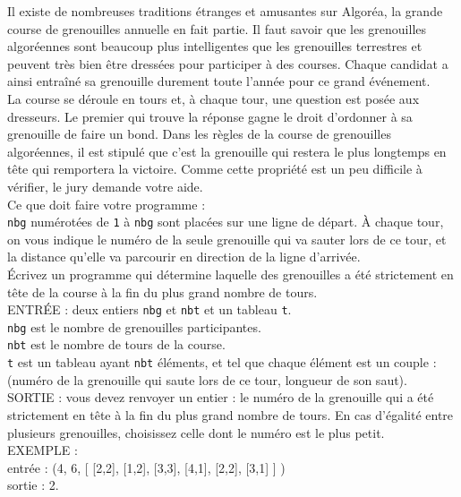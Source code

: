\exer{}
\setcounter{numques}{0}

Il existe de nombreuses traditions étranges et amusantes sur Algoréa, la grande course de 
grenouilles annuelle en fait partie. Il faut savoir que les grenouilles algoréennes sont beaucoup 
plus intelligentes que les grenouilles terrestres et peuvent très bien être dressées pour participer 
à des courses. Chaque candidat a ainsi entraîné sa grenouille durement toute l'année pour ce grand 
événement.\\
La course se déroule en tours et, à chaque tour, une question est posée aux dresseurs. Le premier 
qui trouve la réponse gagne le droit d'ordonner à sa grenouille de faire un bond. Dans les règles de 
la course de grenouilles algoréennes, il est stipulé que c'est la grenouille qui restera le plus 
longtemps en tête qui remportera la victoire. Comme cette propriété est un peu difficile à vérifier, 
le jury demande votre aide.\\
Ce que doit faire votre programme :\\

\noindent \texttt{nbg} numérotées de \texttt{1} à \texttt{nbg} sont placées sur une ligne 
de départ. À chaque tour, on vous indique le numéro de la seule grenouille qui va sauter lors de ce 
tour, et la distance qu'elle va parcourir en direction de la ligne d'arrivée.\\
Écrivez un programme qui détermine laquelle des grenouilles a été strictement en tête de la course 
à la fin du plus grand nombre de tours.\\

\noindent ENTRÉE : deux entiers \texttt{nbg} et \texttt{nbt} et un tableau \texttt{t}.\\
\texttt{nbg} est le nombre de grenouilles participantes.\\
\texttt{nbt} est le nombre de tours de la course.\\
\texttt{t} est un tableau ayant \texttt{nbt} éléments, et tel que chaque élément est un couple : 
(numéro de la grenouille qui saute lors de ce tour, longueur de son saut).\\
\noindent SORTIE : vous devez renvoyer un entier : le numéro de la grenouille qui a 
été strictement en tête à la fin du plus grand nombre de tours. En cas d'égalité entre plusieurs 
grenouilles, choisissez celle dont le numéro est le plus petit.\\

\noindent EXEMPLE :\\
entrée : (4, 6, [ [2,2], [1,2], [3,3], [4,1], [2,2], [3,1] ] )\\
sortie : 2.